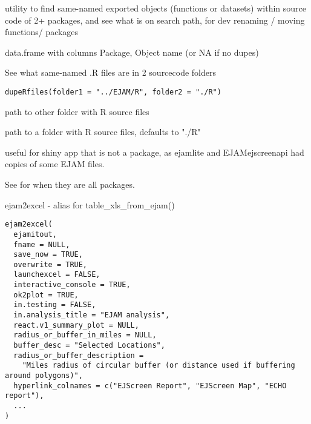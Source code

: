 \documentclass[a4paper]{book}
\begin{document}
%
\begin{Details}\relax
utility to find same-named exported objects (functions or datasets) within source code
of 2+ packages, and see what is on search path, for dev renaming / moving functions/ packages
\end{Details}
%
\begin{Value}
data.frame with columns Package, Object name (or NA if no dupes)
\end{Value}
%
\begin{SeeAlso}\relax
{}
\end{SeeAlso}
%
\begin{Description}\relax
See what same-named .R files are in 2 sourcecode folders
\end{Description}
%
\begin{Usage}
\begin{verbatim}
dupeRfiles(folder1 = "../EJAM/R", folder2 = "./R")
\end{verbatim}
\end{Usage}
%
\begin{Arguments}
\begin{ldescription}
\item[\code{folder1}] path to other folder with R source files

\item[\code{folder2}] path to a folder with R source files, defaults to "./R"
\end{ldescription}
\end{Arguments}
%
\begin{Details}\relax
useful for shiny app that is not a package,
as ejamlite and EJAMejscreenapi had copies of some EJAM files.

See  for when they are all packages.
\end{Details}
%
\begin{Description}\relax
ejam2excel - alias for table\_xls\_from\_ejam()
\end{Description}
%
\begin{Usage}
\begin{verbatim}
ejam2excel(
  ejamitout,
  fname = NULL,
  save_now = TRUE,
  overwrite = TRUE,
  launchexcel = FALSE,
  interactive_console = TRUE,
  ok2plot = TRUE,
  in.testing = FALSE,
  in.analysis_title = "EJAM analysis",
  react.v1_summary_plot = NULL,
  radius_or_buffer_in_miles = NULL,
  buffer_desc = "Selected Locations",
  radius_or_buffer_description =
    "Miles radius of circular buffer (or distance used if buffering around polygons)",
  hyperlink_colnames = c("EJScreen Report", "EJScreen Map", "ECHO report"),
  ...
)
\end{verbatim}
\end{Usage}
\end{document}
